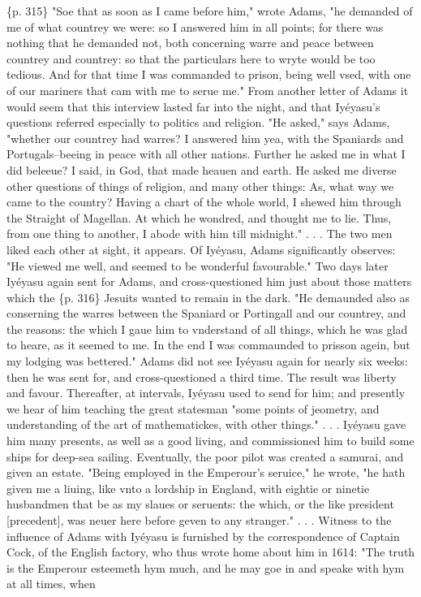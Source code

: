 \{p. 315\} "Soe that as soon as I came before him," wrote Adams, "he demanded of me of what countrey we were: so I answered him in all points; for there was nothing that he demanded not, both concerning warre and peace between countrey and countrey: so that the particulars here to wryte would be too tedious. And for that time I was commanded to prison, being well vsed, with one of our mariners that cam with me to serue me." From another letter of Adams it would seem that this interview lasted far into the night, and that Iyéyasu's questions referred especially to politics and religion. "He asked," says Adams, "whether our countrey had warres? I answered him yea, with the Spaniards and Portugals--beeing in peace with all other nations. Further he asked me in what I did beleeue? I said, in God, that made heauen and earth. He asked me diverse other questions of things of religion, and many other things: As, what way we came to the country? Having a chart of the whole world, I shewed him through the Straight of Magellan. At which he wondred, and thought me to lie. Thus, from one thing to another, I abode with him till midnight." . . . The two men liked each other at sight, it appears. Of Iyéyasu, Adams significantly observes: "He viewed me well, and seemed to be wonderful favourable." Two days later Iyéyasu again sent for Adams, and cross-questioned him just about those matters which the \{p. 316\} Jesuits wanted to remain in the dark. "He demaunded also as conserning the warres between the Spaniard or Portingall and our countrey, and the reasons: the which I gaue him to vnderstand of all things, which he was glad to heare, as it seemed to me. In the end I was commaunded to prisson agein, but my lodging was bettered." Adams did not see Iyéyasu again for nearly six weeks: then he was sent for, and cross-questioned a third time. The result was liberty and favour. Thereafter, at intervals, Iyéyasu used to send for him; and presently we hear of him teaching the great statesman "some points of jeometry, and understanding of the art of mathematickes, with other things." . . . Iyéyasu gave him many presents, as well as a good living, and commissioned him to build some ships for deep-sea sailing. Eventually, the poor pilot was created a samurai, and given an estate. "Being employed in the Emperour's seruice," he wrote, "he hath given me a liuing, like vnto a lordship in England, with eightie or ninetie husbandmen that be as my slaues or seruents: the which, or the like president [precedent], was neuer here before geven to any stranger." . . . Witness to the influence of Adams with Iyéyasu is furnished by the correspondence of Captain Cock, of the English factory, who thus wrote home about him in 1614: "The truth is the Emperour esteemeth hym much, and he may goe in and speake with hym at all times, when

